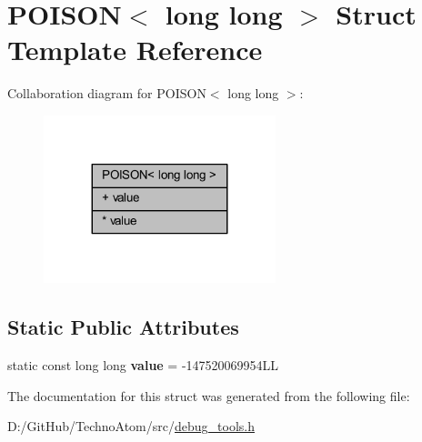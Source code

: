 \hypertarget{struct_p_o_i_s_o_n_3_01long_01long_01_4}{}\section{P\+O\+I\+S\+ON$<$ long long $>$ Struct Template Reference}
\label{struct_p_o_i_s_o_n_3_01long_01long_01_4}


Collaboration diagram for P\+O\+I\+S\+ON$<$ long long $>$\+:
\nopagebreak
\begin{figure}[H]
\begin{center}
\leavevmode
\includegraphics[width=191pt]{struct_p_o_i_s_o_n_3_01long_01long_01_4__coll__graph}
\end{center}
\end{figure}
\subsection*{Static Public Attributes}
\textbf{ }\par
\begin{DoxyCompactItemize}
\item 
\mbox{\label{struct_p_o_i_s_o_n_3_01long_01long_01_4_a92c6c904c4763d3f39cd904cada4ec44}} 
static const long long {\bfseries value} = -\/147520069954\+LL
\end{DoxyCompactItemize}



The documentation for this struct was generated from the following file\+:\begin{DoxyCompactItemize}
\item 
D\+:/\+Git\+Hub/\+Techno\+Atom/src/\hyperlink{debug__tools_8h}{debug\+\_\+tools.\+h}\end{DoxyCompactItemize}
